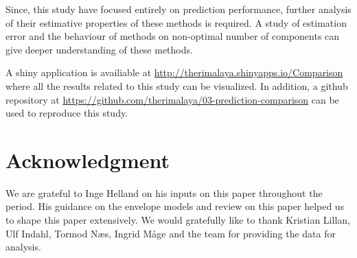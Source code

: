 \documentclass[12pt,3p,authoryear]{elsarticle}
\begin{document}
Since, this study have focused entirely on prediction performance,
further analysis of their estimative properties of these methods is
required. A study of estimation error and the behaviour of methods on
non-optimal number of components can give deeper understanding of these
methods.

A shiny application \citep{shiny} is availiable at
\url{http://therimalaya.shinyapps.io/Comparison} where all the results
related to this study can be visualized. In addition, a github
repository at
\url{https://github.com/therimalaya/03-prediction-comparison} can be
used to reproduce this study.

\section{Acknowledgment}\label{acknowledgment}

We are grateful to Inge Helland on his inputs on this paper throughout
the period. His guidance on the envelope models and review on this paper
helped us to shape this paper extensively. We would gratefully like to
thank Kristian Lillan, Ulf Indahl, Tormod Næs, Ingrid Måge and the team
for providing the data for analysis.

\hypertarget{refs}{}

\appendix



\renewcommand\refname{References}

\end{document}
